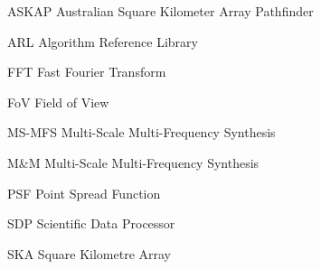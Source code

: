 \documentclass[11pt,a4paper,variablewidth]{article}
\begin{document}
\sdpfrontpage

\sdptableofcontents

\sdplistofabbreviations
\begin{basedescript}{\desclabelstyle{\pushlabel}\desclabelwidth{6em}}
    \item[ASKAP] Australian Square Kilometer Array Pathfinder\vspace{-0.2cm}
    \item[ARL] Algorithm Reference Library\vspace{-0.2cm}
    \item[FFT] Fast Fourier Transform\vspace{-0.2cm}
    \item[FoV] Field of View\vspace{-0.2cm}
    \item[MS-MFS] Multi-Scale Multi-Frequency Synthesis\vspace{-0.2cm}
    \item[M\&M] Multi-Scale Multi-Frequency Synthesis\vspace{-0.2cm}
    \item[PSF] Point Spread Function \vspace{-0.2cm}
    \item[SDP] Scientific Data Processor\vspace{-0.2cm}
    \item[SKA] Square Kilometre Array\vspace{-0.2cm}
\end{basedescript} 

\newcommand{\nuno}{{\left(\frac{\nu}{\nu_0}\right)}}
\newcommand{\dnuno}{{\left(\frac{\nu-\nu_0}{\nu_0}\right)}}

\newcommand{\dg}{^\dag}
\newcommand{\X}{\vec{x}}
\newcommand{\Xd}{\vec{{x}^\dag}}
\newcommand{\B}{\vec{b}}
\newcommand{\Bd}{\vec{b^\dag}}
\newcommand{\V}{\vec{V}}
\newcommand{\Vd}{\vec{V^\dag}}
\newcommand{\A}{{\tens{A}{}}}
\newcommand{\Ad}{{\tens{A^\dag}{}}}
\newcommand{\F}{{\tens{F}{s}}}
\newcommand{\Fd}{{\tens{F^\dag}{}}}
\newcommand{\He}{{\tens{H}{}}}
\newcommand{\Sa}{{\tens{S}{}}}
\newcommand{\Sd}{{\tens{S^\dag}{}}}
\newcommand{\Sna}{\tens{{S_{\nu}}{}}}
\newcommand{\Snd}{\tens{{S_{\nu}^\dag}{}}}
\newcommand{\T}{{\tens{T}{}}}
\newcommand{\W}{{\tens{W}{}}}
\newcommand{\Wd}{{\tens{W^\dag}{}}}
\newcommand{\Pb}{{\vec{P}}}
\end{document}
